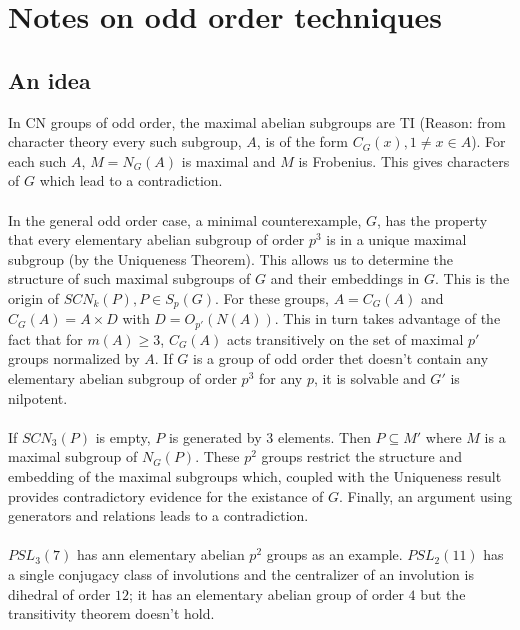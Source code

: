 \chapter{Notes on odd order techniques}
\section {An idea} 
In CN groups of odd order, the maximal abelian subgroups are TI (Reason: from character theory every such
subgroup, $A$, is of the form $C_G(x), 1 \ne x \in A$).   For each such $A$, $M=N_G(A)$ is maximal
and $M$ is Frobenius.  This gives characters of $G$ which lead to a contradiction.
\\
\\
In the general
odd order case, a minimal counterexample, $G$, has the property that every elementary abelian subgroup
of order $p^3$ is in a unique maximal subgroup (by the Uniqueness Theorem).  This allows
us to determine the structure of such maximal subgroups of $G$ and their embeddings in $G$.
This is the origin of
$SCN_k(P), P \in S_p(G)$.  For these groups, $A=C_G(A)$ and $C_G(A) = A \times D$ with $D=O_{p'}(N(A))$.
This in turn takes advantage of the fact that for $m(A) \geq 3$, $C_G(A)$ acts transitively on the set of
maximal $p'$ groups normalized by $A$.  If $G$ is a group of odd order thet doesn't contain any
elementary abelian subgroup of order $p^3$ for any $p$, it is solvable and $G'$ is nilpotent.
\\
\\
If $SCN_3(P)$ is empty, $P$ is generated by $3$ elements.  Then $P \subseteq M'$ where $M$ is a maximal subgroup
of $N_G(P)$.  These $p^2$ groups restrict the structure and embedding of the maximal subgroups which, coupled
with the Uniqueness result provides contradictory evidence for the existance of $G$.
Finally, an argument using generators and relations leads to a contradiction.  
\\
\\
$PSL_3(7)$ has ann elementary abelian $p^2$ groups as an example.  $PSL_2(11)$ has a single conjugacy
class of involutions and the centralizer of an involution is dihedral of order $12$; it has an elementary
abelian group of order $4$ but the transitivity theorem doesn't hold.
